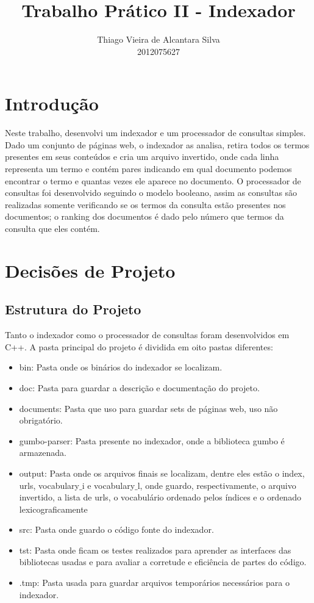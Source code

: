 \documentclass[11pt]{article}
\title{\textbf{Trabalho Prático II - Indexador}}
\author{Thiago Vieira de Alcantara Silva\\2012075627}
\date{}
\begin{document}
\maketitle

\section{Introdução}
Neste trabalho, desenvolvi um indexador e um processador de consultas simples. Dado um conjunto de páginas web, o indexador as analisa, retira todos os termos presentes em seus conteúdos e cria um arquivo invertido, onde cada linha representa um termo e contém pares indicando em qual documento podemos encontrar o termo e quantas vezes ele aparece no documento. O processador de consultas foi desenvolvido seguindo o modelo booleano, assim as consultas são realizadas somente verificando se os termos da consulta estão presentes nos documentos; o ranking dos documentos é dado pelo número que termos da consulta que eles contém.

\section{Decisões de Projeto}
\subsection{Estrutura do Projeto}
Tanto o indexador como o processador de consultas foram desenvolvidos em C++.
A pasta principal do projeto é dividida em oito pastas diferentes:
\begin{itemize}
\item bin: Pasta onde os binários do indexador se localizam.
\item doc: Pasta para guardar a descrição e documentação do projeto.
\item documents: Pasta que uso para guardar sets de páginas web, uso não obrigatório.
\item gumbo-parser: Pasta presente no indexador, onde a biblioteca gumbo é armazenada.
\item output: Pasta onde os arquivos finais se localizam, dentre eles estão o index, urls, vocabulary$\_$i e vocabulary$\_$l, onde guardo, respectivamente, o arquivo invertido, a lista de urls, o vocabulário ordenado pelos índices e o ordenado lexicograficamente
\item src: Pasta onde guardo o código fonte do indexador.
\item tst: Pasta onde ficam os testes realizados para aprender as interfaces das bibliotecas usadas e para avaliar a corretude e eficiência de partes do código.
\item .tmp: Pasta usada para guardar arquivos temporários necessários para o indexador.
\end{itemize}
\end{document}
